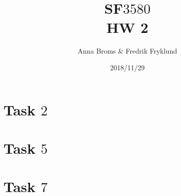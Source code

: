 \documentclass[a4paper]{article}
\title{SF$3580$\\HW 2}
\author{Anna Broms \& Fredrik Fryklund}
\date{2018/11/29}
\begin{document}
\maketitle

\section{Task $2$}

%
% 
\section{Task $5$}

% 
\section{Task $7$}






\end{document}

